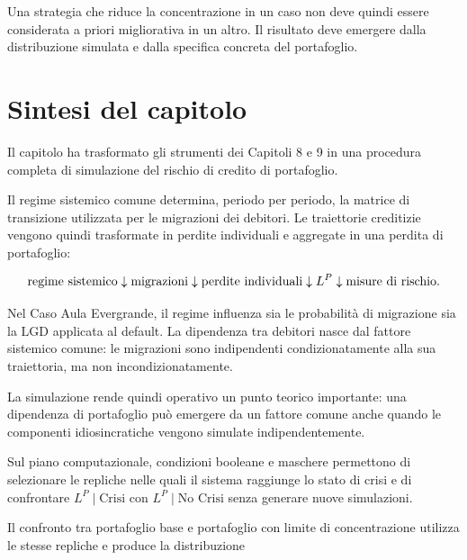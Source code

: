 Una strategia che riduce la concentrazione in un caso non deve quindi essere
considerata a priori migliorativa in un altro. Il risultato deve emergere
dalla distribuzione simulata e dalla specifica concreta del portafoglio.
%


\section{Sintesi del capitolo}

Il capitolo ha trasformato gli strumenti dei Capitoli 8 e 9 in una procedura
completa di simulazione del rischio di credito di portafoglio.

Il regime sistemico comune determina, periodo per periodo, la matrice di
transizione utilizzata per le migrazioni dei debitori. Le traiettorie
creditizie vengono quindi trasformate in perdite individuali e aggregate in
una perdita di portafoglio:

\[
\text{regime sistemico}
\\
\downarrow
\\
\text{migrazioni}
\\
\downarrow
\\
\text{perdite individuali}
\\
\downarrow
\\
L^P
\\
\downarrow
\\
\text{misure di rischio}.
\]

Nel Caso Aula Evergrande, il regime influenza sia le probabilit\`a di
migrazione sia la $\mathrm{LGD}$ applicata al default. La dipendenza tra debitori nasce
dal fattore sistemico comune: le migrazioni sono indipendenti
condizionatamente alla sua traiettoria, ma non incondizionatamente.

La simulazione rende quindi operativo un punto teorico importante: una
dipendenza di portafoglio pu\`o emergere da un fattore comune anche quando le
componenti idiosincratiche vengono simulate indipendentemente.

Sul piano computazionale, condizioni booleane e maschere permettono di
selezionare le repliche nelle quali il sistema raggiunge lo stato di crisi e
di confrontare $L^P\mid\text{Crisi}$ con $L^P\mid\text{No Crisi}$ senza
generare nuove simulazioni.

Il confronto tra portafoglio base e portafoglio con limite di concentrazione
utilizza le stesse repliche e produce la distribuzione

